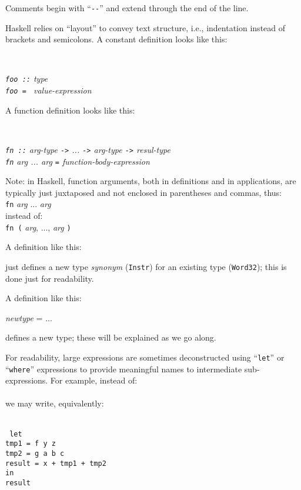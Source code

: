 \documentclass[11pt]{article}
\newcommand{\hmm}{\hspace*{2em}}
\newcommand{\hmmm}{\hspace*{3em}}
\newcommand{\hmmmm}{\hspace*{4em}}
\begin{document}
Comments begin with ``\verb|--|'' and extend through the end of the line.

Haskell relies on ``layout'' to convey text structure, i.e.,
indentation instead of brackets and semicolons. A constant definition
looks like this:

\hmmmm \
\begin{minipage}[t]{4in}\it
{\tt foo ::} type \\
{\tt foo = } value-expression
\end{minipage}

A function definition looks like this:

\hmmmm \
\begin{minipage}[t]{4in}\it
{\tt fn ::} arg-type {\tt ->} ... {\tt ->} arg-type {\tt ->} resul-type \\
{\tt fn} arg ... arg {\tt  =} function-body-expression
\end{minipage}

Note: in Haskell, function arguments, both in definitions
and in applications, are typically just juxtaposed and not enclosed in
parentheses and commas, thus: \\
\hspace*{2in} {\tt fn} \emph{arg} ... \emph{arg} \\
instead of: \\
\hspace*{2in} {\tt fn (} \emph{arg}, ..., \emph{arg} {\tt )}

A definition like this:

\hmmm {\tt type Instr = Word32}

just defines a new type \emph{synonym} ({\tt Instr}) for an existing type ({\tt Word32});
this is done just for readability.

A definition like this:

\hmmm {\tt data} \emph{newtype} = ...

defines a new type; these will be explained as we go along.

For readability, large expressions are sometimes deconstructed using
``{\tt let}'' or ``{\tt where}'' expressions to provide meaningful names to
intermediate sub-expressions. For example, instead of: \\
\hmmmm{\tt x + f y z - g a b c} \\
we may write, equivalently: \\
\hmmmm \
\begin{minipage}[t]{4in}\tt
let \\
\hmm tmp1 = f y z \\
\hmm tmp2 = g a b c \\
\hmm result = x + tmp1 + tmp2 \\
in \\
\hmm result
\end{minipage}
\end{document}
